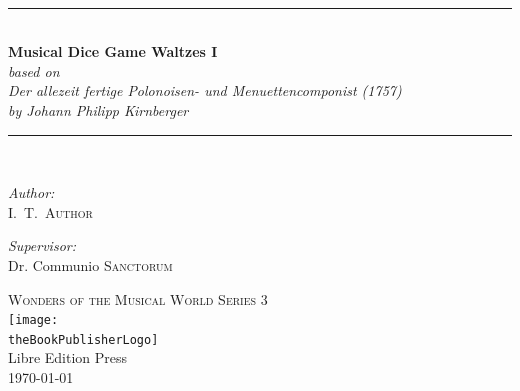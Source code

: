 \documentclass[a4paper,x11names,svgnames,10pt]{article}
\title{\textsc{\mdgBookTitle}}
\author{\textsc{\authorFirstMidNameInit \authorLastName}}
\date{\textsc{\dateGenerated}}
\def\authorFirstMidNameInit{I.\ T.\ }
\def\authorLastName{Author}
\def\dateGenerated{\today}
\def\volNumber{I}
\def\mdgBookTitle{Musical Dice Game Waltzes \volNumber}
\def\mdgBookSubTitle{{\small based on}\\ Der allezeit fertige Polonoisen- und Menuettencomponist (1757) \\ by Johann Philipp Kirnberger}
\def\theBookSeries{Wonders of the Musical World Series 3}
\def\theBookPublisher{Libre Edition Press}
\def\theBookPublisherLogo{../images/1ed.png}
\newcommand{\HRule}{\rule{\linewidth}{0.5mm}}
\begin{document}


\newpage

${}_{}$\\
\vspace{1.00in}	
\thispagestyle{empty}
\begin{center}
	\HRule \\[0.4cm]
	{\huge \bfseries \mdgBookTitle} \\[0.2cm]
	{\large{\em \mdgBookSubTitle} }\\[0.2cm]
	\HRule \\[1.5cm]
	\begin{minipage}{0.4\textwidth}
		\begin{flushleft} \large
			\emph{Author:}\\
			\authorFirstMidNameInit \textsc{\authorLastName}
		\end{flushleft}
	\end{minipage}
	\begin{minipage}{0.4\textwidth}
		\begin{flushright} \large
			\emph{Supervisor:} \\
			Dr. Communio \textsc{Sanctorum}
		\end{flushright}
	\end{minipage}
	\vfill
	{\textsc{\Large \theBookSeries}}  \\[0.2cm] 
	\texttt{[image: \\theBookPublisherLogo]}\\ 
	{\large \theBookPublisher \\
       \dateGenerated }\\
	\vspace{2.50in}
\end{center}
\newpage


\tableofcontents\label{tabofcon}

\newpage
\end{document}
